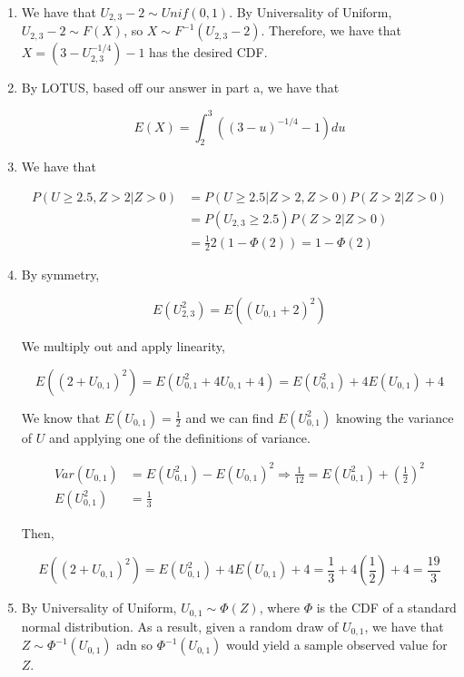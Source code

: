 \documentclass[11pt]{article}
\begin{document}
\begin{solution}
\begin{enumerate}
\item We have that $U_{2,3} - 2 \sim Unif(0,1)$. By Universality of Uniform, $U_{2,3} - 2 \sim F(X)$, so $X \sim F^{-1}(U_{2,3} - 2)$. Therefore, we have that $X = (3 - U_{2,3}^{-1/4}) - 1$ has the desired CDF.

\item By LOTUS, based off our answer in part a, we have that

$$E(X) = \int_{2}^{3} ((3-u)^{-1/4} - 1)du$$

\item We have that

\begin{align*}
P(U \ge 2.5, Z > 2 | Z > 0) &= P(U \ge 2.5|Z>2, Z>0)P(Z>2|Z>0) \\
&= P(U_{2,3} \ge 2.5)P(Z>2|Z>0) \\
&= \frac{1}{2}2(1-\Phi(2)) = 1 - \Phi(2)
\end{align*}

\item By symmetry,

$$E(U_{2,3}^2) = E((U_{0,1} + 2)^2)$$

We multiply out and apply linearity,

$$E((2 + U_{0,1})^2) = E(U_{0,1}^2 + 4U_{0,1} + 4) = E(U_{0,1}^2) + 4E(U_{0,1}) + 4$$

We know that $E(U_{0,1}) = \frac{1}{2}$ and we can find $E(U_{0,1}^2)$ knowing the variance of $U$ and applying one of the definitions of variance.

\begin{align*}
Var(U_{0,1}) &= E(U_{0,1}^2) - E(U_{0,1})^2 \Rightarrow \frac{1}{12} = E(U_{0,1}^2) + (\frac{1}{2})^2 \\
E(U_{0,1}^2) &= \frac{1}{3}
\end{align*}

Then,

$$E((2+U_{0,1})^2) = E(U_{0,1}^2) + 4E(U_{0,1}) + 4 = \frac{1}{3} + 4(\frac{1}{2}) + 4 = \frac{19}{3}$$

\item By Universality of Uniform, $U_{0,1} \sim \Phi(Z)$, where $\Phi$ is the CDF of a standard normal distribution. As a result, given a random draw of $U_{0,1}$, we have that $Z \sim \Phi^{-1}(U_{0,1})$ adn so $\Phi^{-1}(U_{0,1})$ would yield a sample observed value for $Z$.

\end{enumerate}
\end{solution}
\end{document}
